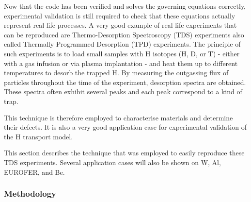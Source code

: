 Now that the code has been verified and solves the governing equations correctly, experimental validation is still required to check that these equations actually represent real life processes.
A very good example of real life experiments that can be reproduced are Thermo-Desorption Spectroscopy (TDS) experiments also called Thermally Programmed Desorption (TPD) experiments.
The principle of such experiments is to load small samples with H isotopes (H, D, or T) - either with a gas infusion or via plasma implantation - and heat them up to different temperatures to desorb the trapped H.
By measuring the outgassing flux of particles throughout the time of the experiment, desorption spectra are obtained.
These spectra often exhibit several peaks and each peak correspond to a kind of trap.

This technique is therefore employed to characterise materials and determine their defects. 
It is also a very good application case for experimental validation of the H transport model.

This section describes the technique that was employed to easily reproduce these TDS experiments.
Several application cases will also be shown on W, Al, EUROFER, and Be.

\subsubsection{Methodology} \label{methodology}


